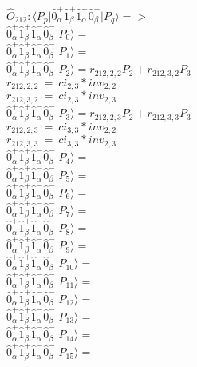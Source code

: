 \documentclass[14pt]{article}
\begin{document}
    $\hat{O}_{212}:  \langle{P_p}\vert \hat{0}_{\alpha}^{+}\hat{1}_{\beta}^{+}\hat{1}_{\alpha}^{-}\hat{0}_{\beta}^{-} \vert{P_q}\rangle => $ \\ 
    $ \hat{0}_{\alpha}^{+}\hat{1}_{\beta}^{+}\hat{1}_{\alpha}^{-}\hat{0}_{\beta}^{-} \vert{P_{0}}\rangle =  $ \\ 
    $ \hat{0}_{\alpha}^{+}\hat{1}_{\beta}^{+}\hat{1}_{\alpha}^{-}\hat{0}_{\beta}^{-} \vert{P_{1}}\rangle =  $ \\ 
    $ \hat{0}_{\alpha}^{+}\hat{1}_{\beta}^{+}\hat{1}_{\alpha}^{-}\hat{0}_{\beta}^{-} \vert{P_{2}}\rangle = {r}_{212,2,2}P_{2}+{r}_{212,3,2}P_{3} $ \\ 
    ${r}_{212,2,2}\ =\ {ci}_{2,3}*{inv}_{2,2} $ \\ 
    ${r}_{212,3,2}\ =\ {ci}_{2,3}*{inv}_{2,3} $ \\ 
    $ \hat{0}_{\alpha}^{+}\hat{1}_{\beta}^{+}\hat{1}_{\alpha}^{-}\hat{0}_{\beta}^{-} \vert{P_{3}}\rangle = {r}_{212,2,3}P_{2}+{r}_{212,3,3}P_{3} $ \\ 
    ${r}_{212,2,3}\ =\ {ci}_{3,3}*{inv}_{2,2} $ \\ 
    ${r}_{212,3,3}\ =\ {ci}_{3,3}*{inv}_{2,3} $ \\ 
    $ \hat{0}_{\alpha}^{+}\hat{1}_{\beta}^{+}\hat{1}_{\alpha}^{-}\hat{0}_{\beta}^{-} \vert{P_{4}}\rangle =  $ \\ 
    $ \hat{0}_{\alpha}^{+}\hat{1}_{\beta}^{+}\hat{1}_{\alpha}^{-}\hat{0}_{\beta}^{-} \vert{P_{5}}\rangle =  $ \\ 
    $ \hat{0}_{\alpha}^{+}\hat{1}_{\beta}^{+}\hat{1}_{\alpha}^{-}\hat{0}_{\beta}^{-} \vert{P_{6}}\rangle =  $ \\ 
    $ \hat{0}_{\alpha}^{+}\hat{1}_{\beta}^{+}\hat{1}_{\alpha}^{-}\hat{0}_{\beta}^{-} \vert{P_{7}}\rangle =  $ \\ 
    $ \hat{0}_{\alpha}^{+}\hat{1}_{\beta}^{+}\hat{1}_{\alpha}^{-}\hat{0}_{\beta}^{-} \vert{P_{8}}\rangle =  $ \\ 
    $ \hat{0}_{\alpha}^{+}\hat{1}_{\beta}^{+}\hat{1}_{\alpha}^{-}\hat{0}_{\beta}^{-} \vert{P_{9}}\rangle =  $ \\ 
    $ \hat{0}_{\alpha}^{+}\hat{1}_{\beta}^{+}\hat{1}_{\alpha}^{-}\hat{0}_{\beta}^{-} \vert{P_{10}}\rangle =  $ \\ 
    $ \hat{0}_{\alpha}^{+}\hat{1}_{\beta}^{+}\hat{1}_{\alpha}^{-}\hat{0}_{\beta}^{-} \vert{P_{11}}\rangle =  $ \\ 
    $ \hat{0}_{\alpha}^{+}\hat{1}_{\beta}^{+}\hat{1}_{\alpha}^{-}\hat{0}_{\beta}^{-} \vert{P_{12}}\rangle =  $ \\ 
    $ \hat{0}_{\alpha}^{+}\hat{1}_{\beta}^{+}\hat{1}_{\alpha}^{-}\hat{0}_{\beta}^{-} \vert{P_{13}}\rangle =  $ \\ 
    $ \hat{0}_{\alpha}^{+}\hat{1}_{\beta}^{+}\hat{1}_{\alpha}^{-}\hat{0}_{\beta}^{-} \vert{P_{14}}\rangle =  $ \\ 
    $ \hat{0}_{\alpha}^{+}\hat{1}_{\beta}^{+}\hat{1}_{\alpha}^{-}\hat{0}_{\beta}^{-} \vert{P_{15}}\rangle =  $ \\ 
    
\end{document}
